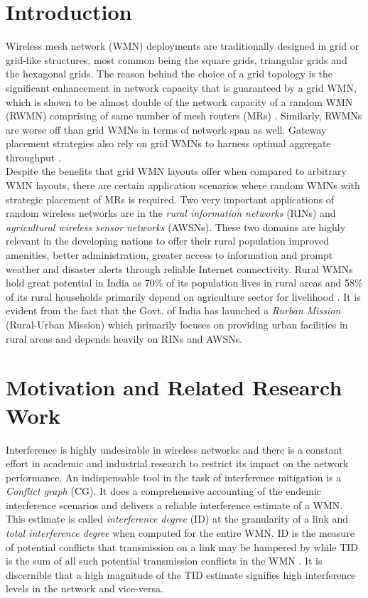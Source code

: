 \documentclass[conference]{IEEEtran}
\begin{document}
\section{Introduction}
Wireless mesh network (WMN) deployments are traditionally designed in grid or grid-like structures, most common being the square grids, triangular grids and the hexagonal grids. The reason behind the choice of a grid topology is the significant enhancement in network capacity that is guaranteed by a grid WMN, which is shown to be almost double of the network capacity of a random WMN (RWMN) comprising of same number of mesh routers (MRs) \cite{Grid}. Similarly, RWMNs are worse off than grid WMNs in terms of network span as well. Gateway placement strategies also rely on grid WMNs to harness optimal aggregate throughput \cite{Grid3}.\\
Despite the benefits that grid WMN layouts offer when compared to arbitrary WMN layouts, there are certain application scenarios where random WMNs with strategic placement of MRs is required. Two very important applications of random wireless networks are in the \textit{rural information networks} (RINs) and \textit{agricultural wireless sensor networks} (AWSNs). These two domains are highly relevant in the developing nations to offer their rural population improved amenities, better administration, greater access to information and prompt weather and disaster alerts through reliable Internet connectivity. Rural WMNs hold great potential in India as 70\% of its population lives in rural areas and 58\% of its rural households primarily depend on agriculture sector for livelihood \cite{census}. It is evident from the fact that the Govt. of India has launched a \textit{Rurban Mission} (Rural-Urban Mission) which primarily focuses on providing urban facilities in rural areas and depends heavily on RINs and AWSNs.

\section{Motivation and Related Research Work}

Interference is highly undesirable in wireless networks and there is a constant effort in academic and industrial research to restrict its impact on the network performance. An indispensable tool in the task of interference mitigation is a \textit{Conflict graph} (CG). It does a comprehensive accounting of the endemic interference scenarios and delivers a reliable interference estimate of a WMN. This estimate is called \textit{interference degree} (ID) at the granularity of a link and \textit{total interference degree} when computed for the entire WMN. ID is the measure of potential conflicts that transmission on a link may be hampered by while TID is the sum of all such potential transmission conflicts in the WMN \cite{22Ramachandran}. It is discernible that a high magnitude of the TID estimate signifies high interference levels in the network and vice-versa.
\end{document}
